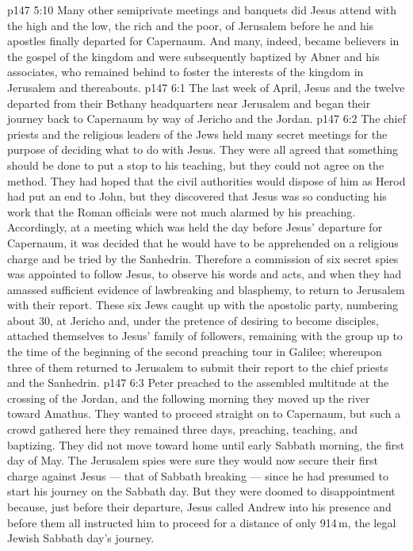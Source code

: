 \vs p147 5:10 \pc Many other semiprivate meetings and banquets did Jesus attend with the high and the low, the rich and the poor, of Jerusalem before he and his apostles finally departed for Capernaum. And many, indeed, became believers in the gospel of the kingdom and were subsequently baptized by Abner and his associates, who remained behind to foster the interests of the kingdom in Jerusalem and thereabouts.
\vs p147 6:1 The last week of April, Jesus and the twelve departed from their Bethany headquarters near Jerusalem and began their journey back to Capernaum by way of Jericho and the Jordan.
\vs p147 6:2 The chief priests and the religious leaders of the Jews held many secret meetings for the purpose of deciding what to do with Jesus. They were all agreed that something should be done to put a stop to his teaching, but they could not agree on the method. They had hoped that the civil authorities would dispose of him as Herod had put an end to John, but they discovered that Jesus was so conducting his work that the Roman officials were not much alarmed by his preaching. Accordingly, at a meeting which was held the day before Jesus’ departure for Capernaum, it was decided that he would have to be apprehended on a religious charge and be tried by the Sanhedrin. Therefore a commission of six secret spies was appointed to follow Jesus, to observe his words and acts, and when they had amassed sufficient evidence of lawbreaking and blasphemy, to return to Jerusalem with their report. These six Jews caught up with the apostolic party, numbering about 30, at Jericho and, under the pretence of desiring to become disciples, attached themselves to Jesus’ family of followers, remaining with the group up to the time of the beginning of the second preaching tour in Galilee; whereupon three of them returned to Jerusalem to submit their report to the chief priests and the Sanhedrin.
\vs p147 6:3 \pc Peter preached to the assembled multitude at the crossing of the Jordan, and the following morning they moved up the river toward Amathus. They wanted to proceed straight on to Capernaum, but such a crowd gathered here they remained three days, preaching, teaching, and baptizing. They did not move toward home until early Sabbath morning, the first day of May. The Jerusalem spies were sure they would now secure their first charge against Jesus --- that of Sabbath breaking --- since he had presumed to start his journey on the Sabbath day. But they were doomed to disappointment because, just before their departure, Jesus called Andrew into his presence and before them all instructed him to proceed for a distance of only 914\,m, the legal Jewish Sabbath day’s journey.
